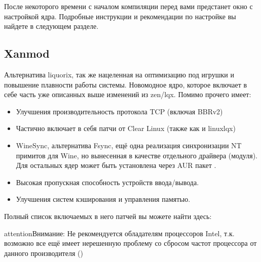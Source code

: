 \documentclass[letterpaper,10pt,russian,openany]{sphinxmanual}
\begin{document}
\sphinxAtStartPar
После некоторого времени с началом компиляции перед вами предстанет окно с настройкой ядра.
Подробные инструкции и рекомендации по настройке вы найдете в следующем разделе.

\noindent{}

\ignorespaces 

\subsection{Xanmod}
\label{\detokenize{source/custom-kernels:xanmod}}\label{\detokenize{source/custom-kernels:linux-xanmod}}\label{\detokenize{source/custom-kernels:index-3}}
\sphinxAtStartPar
Альтернатива liquorix, так же нацеленная на оптимизацию под игрушки и повышение плавности работы системы.
Новомодное ядро, которое включает в себе часть уже описанных выше изменений из zen/lqx. Помимо прочего имеет:
\begin{itemize}
\item {} 
\sphinxAtStartPar
Улучшения производительность протокола TCP (включая BBRv2)

\item {} 
\sphinxAtStartPar
Частично включает в себя патчи от Clear Linux (также как и linux\sphinxhyphen{}lqx)

\item {} 
\sphinxAtStartPar
WineSync, альтернатива Fsync, ещё одна реализация синхронизации NT примитов для Wine, но вынесенная в качестве отдельного драйвера (модуля).
Для остальных ядер может быть установлена через AUR пакет .

\item {} 
\sphinxAtStartPar
Высокая пропускная способность устройств ввода/вывода.

\item {} 
\sphinxAtStartPar
Улучшения систем кэширования и управления памятью.

\end{itemize}

\sphinxAtStartPar
Полный список включаемых в него патчей вы можете найти здесь: 

\begin{sphinxadmonition}{attention}{Внимание:}
\sphinxAtStartPar
Не рекомендуется обладателям процессоров Intel, т.к. возможно все ещё имеет нерешенную проблему со сбросом частот процессора от данного производителя ()
\end{sphinxadmonition}
\end{document}
